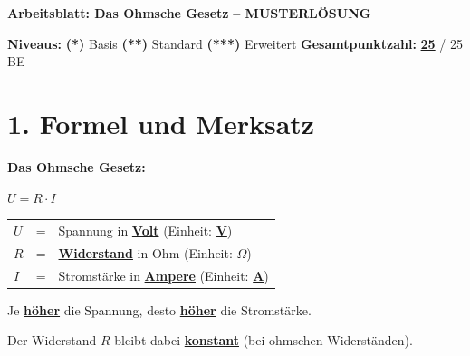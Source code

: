 \documentclass[11pt, a4paper]{article}
\newcommand{\thema}{Das Ohmsche Gesetz}
\newcommand{\lsg}[1]{\textcolor{loesung}{\textbf{\underline{#1}}}}
\newcommand{\niveauEins}{\textcolor{stern1}{\textbf{(*)}}}
\newcommand{\niveauZwei}{\textcolor{stern2}{\textbf{(**)}}}
\newcommand{\niveauDrei}{\textcolor{stern3}{\textbf{(***)}}}}
\begin{document}

\begin{center}
    {\Large\textbf{\textcolor{physik}{Arbeitsblatt: \thema}}}
    \quad
    {\Large\textcolor{loesung}{\textbf{-- MUSTERLÖSUNG}}}
\end{center}

\vspace{0.5em}

\begin{tcolorbox}[colback=hellgrau, colframe=grau, boxrule=0.5pt, arc=0pt]
\small
\textbf{Niveaus:}
\niveauEins{} Basis \quad
\niveauZwei{} Standard \quad
\niveauDrei{} Erweitert
\hfill
\textbf{Gesamtpunktzahl:} \lsg{25} / 25 BE
\end{tcolorbox}

\vspace{1em}


\section*{1. Formel und Merksatz}

\begin{formelbox}
\textbf{Das Ohmsche Gesetz:}

\vspace{1em}
\begin{center}
{\Large $U = R \cdot I$}
\end{center}

\vspace{0.5em}

\begin{tabular}{lll}
$U$ & = & Spannung in \lsg{Volt} (Einheit: \lsg{V}) \\[0.8em]
$R$ & = & \lsg{Widerstand} in Ohm (Einheit: \lsg{$\Omega$}) \\[0.8em]
$I$ & = & Stromstärke in \lsg{Ampere} (Einheit: \lsg{A}) \\
\end{tabular}
\end{formelbox}

\vspace{0.5em}

\begin{merksatz}
Je \lsg{höher} die Spannung, desto \lsg{höher} die Stromstärke.

Der Widerstand $R$ bleibt dabei \lsg{konstant} (bei ohmschen Widerständen).
\end{merksatz}
\end{document}
